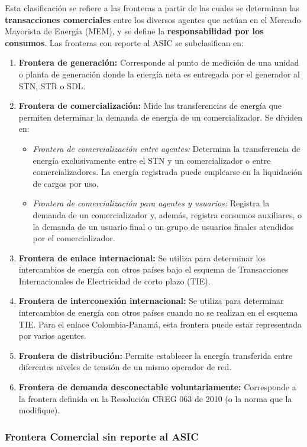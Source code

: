 \documentclass[a5paper]{book}%
\begin{document}
Esta clasificación se refiere a las fronteras a partir de las cuales se determinan las \textbf{transacciones comerciales} entre los diversos agentes que actúan en el Mercado Mayorista de Energía (MEM), y se define la \textbf{responsabilidad por los consumos}. Las fronteras con reporte al ASIC se subclasifican en:

\begin{enumerate}
	\item \textbf{Frontera de generación:} Corresponde al punto de medición de una unidad o planta de generación donde la energía neta es entregada por el generador al STN, STR o SDL.
	\item \textbf{Frontera de comercialización:} Mide las transferencias de energía que permiten determinar la demanda de energía de un comercializador. Se dividen en:
	\begin{itemize}
		\item \textit{Frontera de comercialización entre agentes:} Determina la transferencia de energía exclusivamente entre el STN y un comercializador o entre comercializadores. La energía registrada puede emplearse en la liquidación de cargos por uso.
		\item \textit{Frontera de comercialización para agentes y usuarios:} Registra la demanda de un comercializador y, además, registra consumos auxiliares, o la demanda de un usuario final o un grupo de usuarios finales atendidos por el comercializador.
	\end{itemize}
	\item \textbf{Frontera de enlace internacional:} Se utiliza para determinar los intercambios de energía con otros países bajo el esquema de Transacciones Internacionales de Electricidad de corto plazo (TIE).
	\item \textbf{Frontera de interconexión internacional:} Se utiliza para determinar intercambios de energía con otros países cuando no se realizan en el esquema TIE. Para el enlace Colombia-Panamá, esta frontera puede estar representada por varios agentes.
	\item \textbf{Frontera de distribución:} Permite establecer la energía transferida entre diferentes niveles de tensión de un mismo operador de red.
	\item \textbf{Frontera de demanda desconectable voluntariamente:} Corresponde a la frontera definida en la Resolución CREG 063 de 2010 (o la norma que la modifique).
\end{enumerate}

\subsubsection{Frontera Comercial sin reporte al ASIC}
\end{document}
